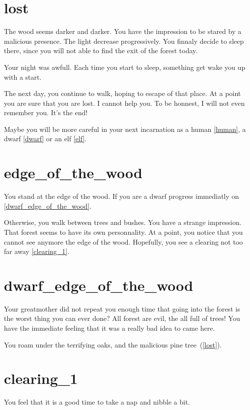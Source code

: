 \section{lost}

The wood seems darker and darker. You have the impression to be stared by a
malicious presence. The light decrease progressively. You finnaly decide to
sleep there, since you will not able to find the exit of the forest today.

Your night was awfull. Each time you start to sleep, something get wake you up
with a start.

The next day, you continue to walk, hoping to escape of that place. At a point
you are sure that you are lost. I cannot help you. To be honnest, I will not
even remember you. It's the end!

\medbreak

Maybe you will be more careful in your next incarnation as a human \ref{human},
a dwarf \ref{dwarf} or an elf \ref{elf}.

\section{edge_of_the_wood}

You stand at the edge of the wood. If you are a dwarf progress immediatly on
\ref{dwarf_edge_of_the_wood}.

Otherwise, you walk between trees and bushes. You have a strange impression.
That forest seems to have its own personnality. At a point, you notice that you
cannot see anymore the edge of the wood. Hopefully, you see a clearing not too
far away \ref{clearing_1}.

\section{dwarf_edge_of_the_wood}

Your greatmother did not repeat you enough time that going into the forest is
the worst thing you can ever done? All forest are evil, the all full of trees!
You have the immediate feeling that it was a really bad idea to came here.

You roam under the terrifying oaks, and the malicious pine tree~(\ref{lost}).

\section{clearing_1}

You feel that it is a good time to take a nap and nibble a bit.

